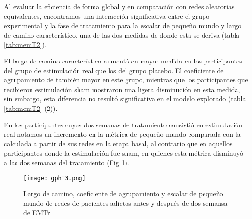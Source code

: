 Al evaluar la eficiencia de forma global y en comparación con redes aleatorias equivalentes, encontramos una interacción significativa entre el grupo experimental y la fase de tratamiento para la escalar de pequeño mundo y largo de camino característico, una de las dos medidas de donde esta se deriva (tabla \ref{tab:memT2}). \par
El largo de camino característico aumentó en mayor medida en los participantes del grupo de estimulación real que los del grupo placebo. El coeficiente de agrupamiento de también mayor en este grupo, mientras que los participantes que recibieron estimulación sham mostraron una ligera disminución en esta medida, sin embargo, esta diferencia no resultó significativa en el modelo explorado (tabla \ref{tab:memT2} (2)). \par
En los participantes cuyas dos semanas de tratamiento consistió en estimulación real notamos un incremento en la métrica de pequeño mundo comparada con la calculada a partir de sus redes en la etapa basal, al contrario que en aquellos participantes donde la estimulación fue sham, en quienes esta métrica disminuyó a las dos semanas del tratamiento (Fig \ref{fig:gpT3}).

\begin{figure}[!ht]
    \centering
    \texttt{[image: gphT3.png]}
    \caption{Largo de camino, coeficiente de agrupamiento y escalar de pequeño mundo de redes de pacientes adictos antes y después de dos semansa de EMTr}
    \label{fig:gpT3}
\end{figure}

